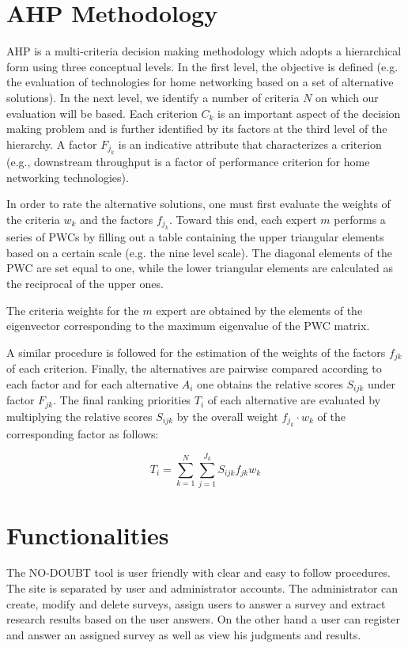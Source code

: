 \documentclass{article}
\begin{document}
\section*{AHP Methodology}
AHP is a multi-criteria decision making methodology which adopts a hierarchical form using three conceptual levels. In the first level, the objective is defined (e.g. the evaluation of technologies for home networking based on a set of alternative solutions). In the next level, we identify a number of criteria $N$ on which our evaluation will be based. Each criterion $C_k$ is an important aspect of the decision making problem and is further identified by its factors at the third level of the hierarchy. A factor $F_{j_k}$ is an indicative attribute that characterizes a criterion (e.g., downstream throughput is a factor of performance criterion for home networking technologies). 

In order to rate the alternative solutions, one must first evaluate the weights of the criteria $w_k$ and the factors $f_{j_k}$. Toward this end, each expert $m$ performs a series of PWCs by filling out a table containing the upper triangular elements based on a certain scale (e.g. the nine level scale). The diagonal elements of the PWC are set equal to one, while the lower triangular elements are calculated as the reciprocal of the upper ones.

The criteria weights for the $m$ expert are obtained by the elements of the eigenvector corresponding to the maximum eigenvalue of the PWC matrix. 

A similar procedure is followed for the estimation of the weights of the factors $f_{jk}$ of each criterion. Finally, the alternatives are pairwise compared according to each factor and for each alternative $A_i$ one obtains the relative scores $S_{ijk}$ under factor $F_{jk}$. The final ranking priorities $T_i$ of each alternative are evaluated by multiplying the relative scores $S_{ijk}$ by the overall weight $f_{j_k} · w_k$ of the corresponding factor as follows:

\begin{equation}
    T_i=\sum_{k=1}^{N}\sum_{j=1}^{J_k}S_{ijk} f_{jk} w_k
\end{equation}

\section*{Functionalities}
The NO-DOUBT tool is user friendly with clear and easy to follow procedures. The site is separated by user and administrator accounts. 
The administrator can create, modify and delete surveys, assign users to answer a survey and extract research results based on the user answers. On the other hand a user can register and answer an assigned survey as well as view his judgments and results.
\end{document}
